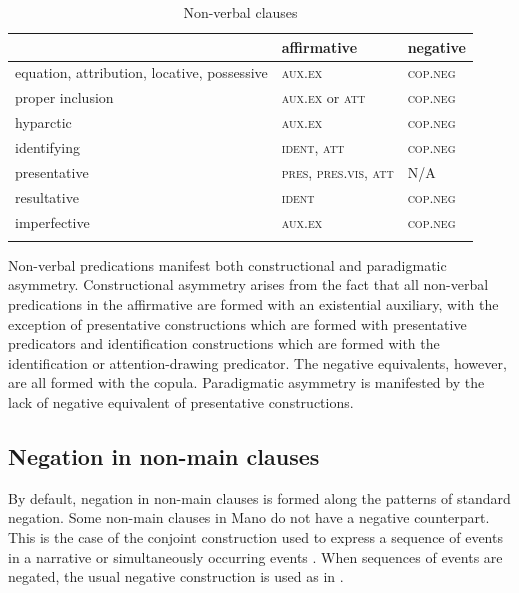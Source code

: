 \documentclass[output=paper,colorlinks,citecolor=brown]{langscibook}
\begin{document}
\begin{table}
    \begin{tabularx}{\textwidth}{p{65mm}Xp{15mm}} 
    \lsptoprule
    & {\bfseries affirmative} & {\bfseries negative}\\
    \midrule
    equation, attribution, locative, possessive & \textsc{aux.ex} & \textsc{cop.neg}\\
    proper inclusion & \textsc{aux.ex} or \textsc{att} & \textsc{cop.neg}\\
    hyparctic & \textsc{aux.ex} & \textsc{cop.neg}\\
    identifying & \textsc{ident, att} & \textsc{cop.neg}\\
    presentative & \textsc{pres, pres.vis, att} & N/A\\
    resultative & \textsc{ident} & \textsc{cop.neg}\\
    imperfective & \textsc{aux.ex} & \textsc{cop.neg}\\
    \lspbottomrule
    \end{tabularx}
\caption{Non-verbal clauses}
\label{tab:mano:3}
\end{table}

Non-verbal predications manifest both constructional and paradigmatic asymmetry. Constructional asymmetry arises from the fact that all non-verbal predications in the affirmative are formed with an existential auxiliary, with the exception of presentative constructions which are formed with presentative predicators and identification constructions which are formed with the identification or attention-drawing predicator. The negative equivalents, however, are all formed with the copula. Paradigmatic asymmetry is manifested by the lack of negative equivalent of presentative constructions.

\subsection{Negation in non-main clauses}\label{sec:mano:2.4}

By default, negation in non-main clauses is formed along the patterns of standard negation. Some non-main clauses in Mano do not have a negative counterpart. This is the case of the conjoint construction used to express a sequence of events in a narrative or simultaneously occurring events . When sequences of events are negated, the usual negative construction is used as in  .
\end{document}

